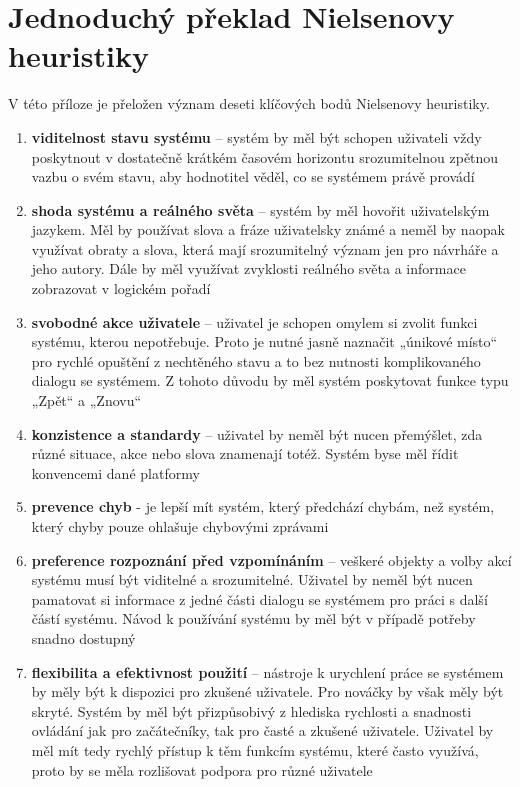 \chapter{Jednoduchý překlad Nielsenovy heuristiky}
V této příloze je přeložen význam deseti klíčových bodů Nielsenovy heuristiky.
\begin{enumerate}
\item \textbf{viditelnost stavu systému} – systém by měl být schopen uživateli vždy poskytnout v dostatečně krátkém časovém horizontu srozumitelnou zpětnou vazbu o svém stavu, aby hodnotitel věděl, co se systémem právě provádí\cite{thesis:flamik} 

\item \textbf{shoda systému a reálného světa} – systém by měl hovořit uživatelským jazykem. Měl by používat slova a fráze uživatelsky známé a neměl by naopak využívat obraty a slova, která mají srozumitelný význam jen pro návrháře a jeho autory. Dále by měl využívat zvyklosti reálného světa a informace zobrazovat v logickém pořadí\cite{thesis:flamik} 

\item \textbf{svobodné akce uživatele} – uživatel je schopen omylem si zvolit funkci systému, kterou nepotřebuje. Proto je nutné jasně naznačit „únikové místo“ pro rychlé opuštění z nechtěného stavu a to bez nutnosti komplikovaného dialogu se systémem. Z tohoto důvodu by měl systém poskytovat funkce typu „Zpět“ a „Znovu“\cite{thesis:flamik} 

\item \textbf{konzistence a standardy} – uživatel by neměl být nucen přemýšlet, zda různé situace, akce nebo slova znamenají totéž. Systém byse měl řídit konvencemi dané platformy\cite{thesis:flamik} 

\item \textbf{prevence chyb} - je lepší mít systém, který předchází chybám, než systém, který chyby pouze ohlašuje chybovými zprávami\cite{thesis:flamik} 

\item \textbf{preference rozpoznání před vzpomínáním} – veškeré objekty a volby akcí systému musí být viditelné a srozumitelné. Uživatel by neměl být nucen pamatovat si informace z jedné části dialogu se systémem pro práci s další částí systému. Návod k používání systému by měl být v případě potřeby snadno dostupný\cite{thesis:flamik} 

\item \textbf{flexibilita a efektivnost použití} – nástroje k urychlení práce se systémem by měly být k dispozici pro zkušené uživatele. Pro nováčky by však měly být skryté. Systém by měl být přizpůsobivý z hlediska rychlosti a snadnosti ovládání jak pro začátečníky, tak pro časté a zkušené uživatele. Uživatel by měl mít tedy rychlý přístup k těm funkcím systému, které často využívá, proto by se měla rozlišovat podpora pro různé uživatele\cite{thesis:flamik} 


\end{enumerate}
